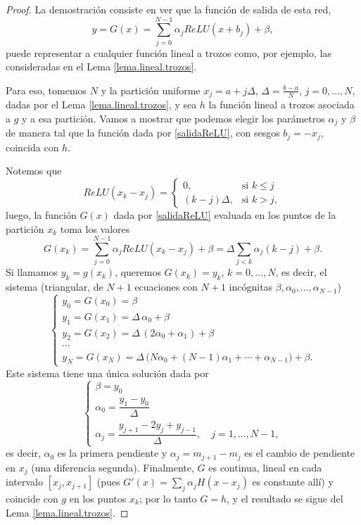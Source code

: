 \documentclass[12pt, a4paper]{amsbook}
\theoremstyle{remark}
\theoremstyle{definition}
\numberwithin{section}{chapter}
\numberwithin{subsection}{section}
\numberwithin{equation}{section}
\numberwithin{figure}{chapter}
\begin{document}
\begin{proof}
La demostración consiste en ver que la función de salida de esta red,
\begin{equation}\label{salidaReLU}
y= G(x) = \sum_{j=0}^{N-1} \alpha_j ReLU(x+b_j) + \beta,
\end{equation}
puede representar a cualquier función lineal a trozos como, por ejemplo, las consideradas en el Lema \ref{lema.lineal.trozos}.

Para eso, tomemos $N$ y la partición uniforme $x_j=a+j\Delta$, $\Delta=\frac{b-a}{N}$, $j=0,\dots,N$, dadas por el Lema \ref{lema.lineal.trozos}, y sea $h$ la función lineal a trozos asociada a $g$ y a esa partición. Vamos a mostrar que podemos elegir los parámetros $\alpha_j$ y $\beta$ de manera tal que la función dada por \eqref{salidaReLU}, con sesgos $b_j=-x_j$, coincida con $h$.

Notemos que
$$
ReLU(x_k-x_j) = \begin{cases}
0,& \text{si } k\le j\\
(k-j)\Delta,& \text{si } k>j,
\end{cases}
$$
luego, la función $G(x)$ dada por \eqref{salidaReLU} evaluada en los puntos de la partición $x_k$ toma los valores
$$
G(x_k) = \sum_{j=0}^{N-1} \alpha_j ReLU(x_k-x_j) + \beta = \Delta \sum_{j<k} \alpha_j (k-j) + \beta.
$$
Si llamamos $y_k=g(x_k)$, queremos $G(x_k)=y_k$, $k=0,\dots,N$, es decir, el sistema (triangular, de $N+1$ ecuaciones con $N+1$ incógnitas $\beta,\alpha_0,\dots,\alpha_{N-1}$)
$$\begin{cases}
y_0=G(x_0)= \beta\\
y_1 = G(x_1) = \Delta\,\alpha_0 + \beta\\
y_2 = G(x_2) = \Delta\,(2\alpha_0 + \alpha_1) + \beta\\
\cdots \\
y_N = G(x_N) = \Delta\,\big(N\alpha_0 + (N-1)\alpha_1+\cdots + \alpha_{N-1}\big) + \beta.
\end{cases}
$$
Este sistema tiene una única solución dada por
$$
\begin{cases}
\beta = y_0\\
\alpha_0 = \dfrac{y_1-y_0}{\Delta}\\[1ex]
\alpha_j = \dfrac{y_{j+1}-2y_j+y_{j-1}}{\Delta},\quad j=1,\dots,N-1,
\end{cases}
$$
es decir, $\alpha_0$ es la primera pendiente y $\alpha_j=m_{j+1}-m_j$ es el cambio de pendiente en $x_j$ (una diferencia segunda). Finalmente, $G$ es continua, lineal en cada intervalo $[x_j,x_{j+1}]$ (pues $G'(x)=\sum_{j}\alpha_jH(x-x_j)$ es constante allí) y coincide con $g$ en los puntos $x_k$; por lo tanto $G=h$, y el resultado se sigue del Lema \ref{lema.lineal.trozos}.
\end{proof}
\end{document}
